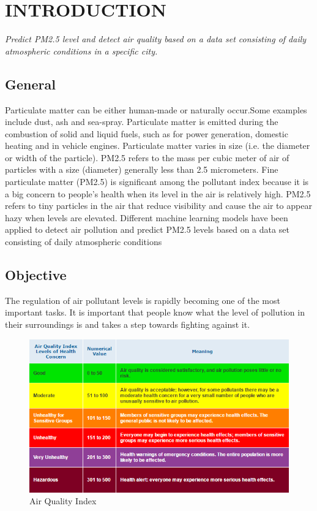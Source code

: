 \chapter {INTRODUCTION}
{\em Predict PM2.5 level and detect air quality based on a data set consisting of daily atmospheric conditions in a specific city.}

\section {General}
{ Particulate matter can be either human-made or naturally occur.Some examples include dust, ash and sea-spray. Particulate matter is emitted during the combustion of solid and liquid fuels, such as for power generation, domestic heating and in vehicle engines. Particulate matter varies in size (i.e. the diameter or width of the particle). PM2.5 refers to the mass per cubic meter of air of particles with a size (diameter) generally less than 2.5 micrometers. Fine particulate matter (PM2.5) is significant among the pollutant index because it is a big concern to people's health when its level in the air is relatively high. PM2.5 refers to tiny particles in the air that reduce visibility and cause the air to appear hazy when levels are elevated. Different machine learning models have been applied to detect air pollution and predict PM2.5 levels based on a data set consisting of daily atmospheric conditions}





\section{Objective}    %
The regulation of air pollutant levels is rapidly becoming one of the most important tasks. It is important that people know what the level of pollution in their surroundings is and takes a step towards fighting against it.

\begin{figure}[h]
	\label{ss}    %
	\centering
	\includegraphics[width= 15 cm]{111.jpg}
	\caption{Air Quality Index}
\end{figure}





